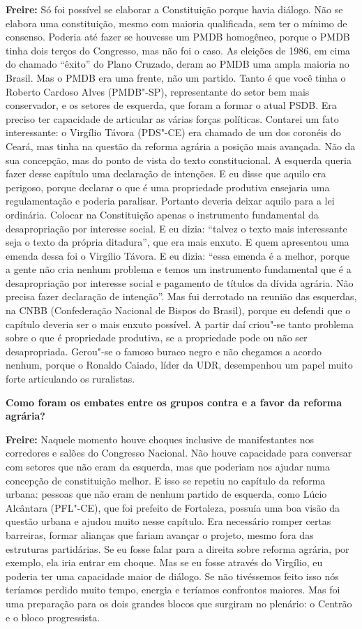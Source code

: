 \textbf{Freire:} Só foi possível se elaborar a Constituição porque havia
diálogo. Não se elabora uma constituição, mesmo com maioria qualificada,
sem ter o mínimo de consenso. Poderia até fazer se houvesse um PMDB
homogêneo, porque o PMDB tinha dois terços do Congresso, mas não foi o
caso. As eleições de 1986, em cima do chamado ``êxito'' do Plano
Cruzado, deram ao PMDB uma ampla maioria no Brasil. Mas o PMDB era uma
frente, não um partido. Tanto é que você tinha o Roberto Cardoso Alves
(PMDB"-SP), representante do setor bem mais conservador, e os setores de
esquerda, que foram a formar o atual PSDB. Era preciso ter capacidade de
articular as várias forças políticas. Contarei um fato interessante: o
Virgílio Távora (PDS"-CE) era chamado de um dos coronéis do Ceará, mas
tinha na questão da reforma agrária a posição mais avançada. Não da sua
concepção, mas do ponto de vista do texto constitucional. A esquerda
queria fazer desse capítulo uma declaração de intenções. E eu disse que
aquilo era perigoso, porque declarar o que é uma propriedade produtiva
ensejaria uma regulamentação e poderia paralisar. Portanto deveria
deixar aquilo para a lei ordinária. Colocar na Constituição apenas o
instrumento fundamental da desapropriação por interesse social. E eu
dizia: ``talvez o texto mais interessante seja o texto da própria
ditadura'', que era mais enxuto. E quem apresentou uma emenda dessa foi
o Virgílio Távora. E eu dizia: ``essa emenda é a melhor, porque a gente
não cria nenhum problema e temos um instrumento fundamental que é a
desapropriação por interesse social e pagamento de títulos da dívida
agrária. Não precisa fazer declaração de intenção''. Mas fui derrotado
na reunião das esquerdas, na CNBB (Confederação Nacional de Bispos do
Brasil), porque eu defendi que o capítulo deveria ser o mais enxuto
possível. A partir daí criou"-se tanto problema sobre o que é propriedade
produtiva, se a propriedade pode ou não ser desapropriada. Gerou"-se o
famoso buraco negro e não chegamos a acordo nenhum, porque o Ronaldo
Caiado, líder da UDR, desempenhou um papel muito forte articulando os
ruralistas.

\textbf{Como foram os embates entre os grupos contra e a favor da
reforma agrária?}

\textbf{Freire:} Naquele momento houve choques inclusive de
manifestantes nos corredores e salões do Congresso Nacional. Não houve
capacidade para conversar com setores que não eram da esquerda, mas que
poderiam nos ajudar numa concepção de constituição melhor. E isso se
repetiu no capítulo da reforma urbana: pessoas que não eram de nenhum
partido de esquerda, como Lúcio Alcântara (PFL"-CE), que foi prefeito de
Fortaleza, possuía uma boa visão da questão urbana e ajudou muito nesse
capítulo. Era necessário romper certas barreiras, formar alianças que
fariam avançar o projeto, mesmo fora das estruturas partidárias. Se eu
fosse falar para a direita sobre reforma agrária, por exemplo, ela iria
entrar em choque. Mas se eu fosse através do Virgílio, eu poderia ter
uma capacidade maior de diálogo. Se não tivéssemos feito isso nós
teríamos perdido muito tempo, energia e teríamos confrontos maiores. Mas
foi uma preparação para os dois grandes blocos que surgiram no plenário:
o Centrão e o bloco progressista.

